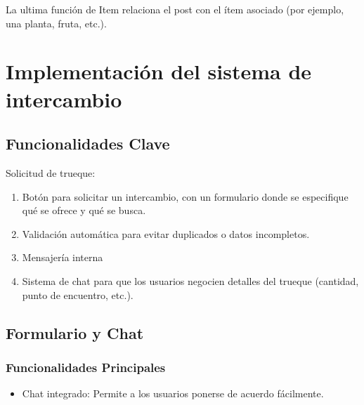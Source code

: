\documentclass[11pt, a4paper, oneside]{book}
\begin{document}
La ultima función de Item relaciona el post con el ítem asociado (por ejemplo, una planta, fruta, etc.).\\


















\chapter{Implementación del sistema de intercambio}
\noindent
\section{Funcionalidades Clave} 

Solicitud de trueque: 

\begin{enumerate} 

    \item Botón para solicitar un intercambio, con un formulario donde se especifique qué se ofrece y qué se busca. 

 \item Validación automática para evitar duplicados o datos incompletos. 

\item Mensajería interna 

\item Sistema de chat para que los usuarios negocien detalles del trueque (cantidad, punto de encuentro, etc.). 

\end{enumerate} 

\section{ Formulario y Chat } 

\subsection{ Funcionalidades Principales} 

\begin{itemize} 

    \item Chat integrado: Permite a los usuarios ponerse de acuerdo fácilmente. 

\end{itemize} 
\end{document}
